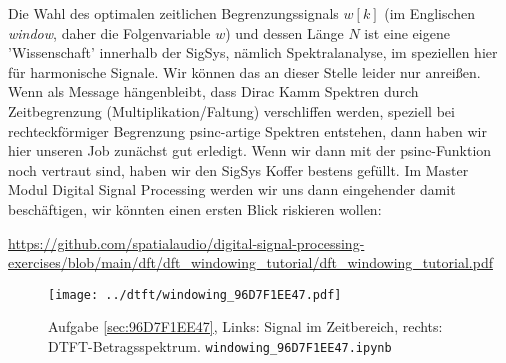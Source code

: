 Die Wahl des optimalen zeitlichen Begrenzungssignals $w[k]$ (im Englischen \textit{window}, daher
die Folgenvariable $w$) und dessen Länge $N$ ist eine eigene 'Wissenschaft' innerhalb
der SigSys, nämlich Spektralanalyse, im speziellen hier für harmonische Signale.
Wir können das an dieser Stelle leider nur anreißen.
%
Wenn als Message hängenbleibt, dass Dirac Kamm Spektren durch Zeitbegrenzung (Multiplikation/Faltung)
verschliffen werden, speziell bei rechteckförmiger Begrenzung psinc-artige Spektren
entstehen, dann haben wir hier unseren Job zunächst gut erledigt.
%
Wenn wir dann mit der psinc-Funktion noch vertraut sind, haben wir den SigSys Koffer
bestens gefüllt.
%
Im Master Modul Digital Signal Processing werden wir uns dann eingehender damit
beschäftigen, wir könnten einen ersten Blick riskieren wollen:

\url{https://github.com/spatialaudio/digital-signal-processing-exercises/blob/main/dft/dft_windowing_tutorial/dft_windowing_tutorial.pdf}


\begin{figure}
\centering
\texttt{[image: ../dtft/windowing\_96D7F1EE47.pdf]}
\caption{Aufgabe \ref{sec:96D7F1EE47}, Links: Signal im Zeitbereich,
rechts: DTFT-Betragsspektrum.
\texttt{windowing\_96D7F1EE47.ipynb}}
\label{fig:windowing_96D7F1EE47}
\end{figure}
